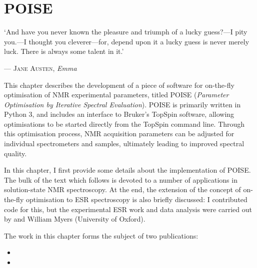 \chapter{POISE}
\label{chpt:poise}

\epigraph{\singlespacing%
`And have you never known the pleasure and triumph of a lucky guess?---I pity you.---I thought you cleverer---for, depend upon it a lucky guess is never merely luck. There is always some talent in it.'%
}{--- \textsc{Jane Austen}, \textit{Emma}}

This chapter describes the development of a piece of software for on-the-fly optimisation of NMR experimental parameters, titled POISE (\textit{Parameter Optimisation by Iterative Spectral Evaluation}).
POISE is primarily written in Python 3, and includes an interface to Bruker's TopSpin software, allowing optimisations to be started directly from the TopSpin command line.
Through this optimisation process, NMR acquisition parameters can be adjusted for individual spectrometers and samples, ultimately leading to improved spectral quality.

In this chapter, I first provide some details about the implementation of POISE.
The bulk of the text which follows is devoted to a number of applications in solution-state NMR spectroscopy.
At the end, the extension of the concept of on-the-fly optimisation to ESR spectroscopy is also briefly discussed: I contributed code for this, but the experimental ESR work and data analysis were carried out by \JBV{} and William Myers (University of Oxford).

The work in this chapter forms the subject of two publications:

\begin{itemize}
    \item {}
    \item {}
\end{itemize}

\clearpage








\printbibliography[heading=subbibnumbered]{}
